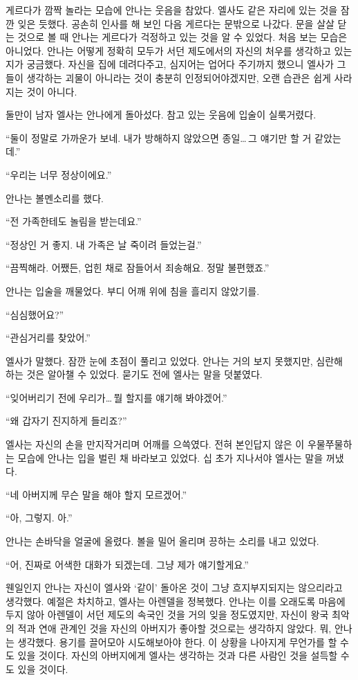 게르다가 깜짝 놀라는 모습에 안나는 웃음을 참았다. 엘사도 같은 자리에 있는 것을 잠깐 잊은 듯했다. 공손히 인사를 해 보인 다음 게르다는 문밖으로 나갔다. 문을 살살 닫는 것으로 볼 때 안나는 게르다가 걱정하고 있는 것을 알 수 있었다. 처음 보는 모습은 아니었다. 안나는 어떻게 정확히 모두가 서던 제도에서의 자신의 처우를 생각하고 있는지가 궁금했다. 자신을 집에 데려다주고, 심지어는 업어다 주기까지 했으니 엘사가 그들이 생각하는 괴물이 아니라는 것이 충분히 인정되어야겠지만, 오랜 습관은 쉽게 사라지는 것이 아니다.

둘만이 남자 엘사는 안나에게 돌아섰다. 참고 있는 웃음에 입술이 실룩거렸다.

``둘이 정말로 가까운가 보네. 내가 방해하지 않았으면 종일\ldots\,그 얘기만 할 거 같았는데.''

``우리는 너무 정상이에요.''

안나는 볼멘소리를 했다.

``전 가족한테도 놀림을 받는데요.''

``정상인 거 좋지. 내 가족은 날 죽이려 들었는걸.''

``끔찍해라. 어쨌든, 업힌 채로 잠들어서 죄송해요. 정말 불편했죠.''

안나는 입술을 깨물었다. 부디 어깨 위에 침을 흘리지 않았기를.

``심심했어요?''

``관심거리를 찾았어.''

엘사가 말했다. 잠깐 눈에 초점이 풀리고 있었다. 안나는 거의 보지 못했지만, 심란해 하는 것은 알아챌 수 있었다. 묻기도 전에 엘사는 말을 덧붙였다.

``잊어버리기 전에 우리가\ldots\,뭘 할지를 얘기해 봐야겠어.''

``왜 갑자기 진지하게 들리죠?''

엘사는 자신의 손을 만지작거리며 어깨를 으쓱였다. 전혀 본인답지 않은 이 우물쭈물하는 모습에 안나는 입을 벌린 채 바라보고 있었다. 십 초가 지나서야 엘사는 말을 꺼냈다.

``네 아버지께 무슨 말을 해야 할지 모르겠어.''

``아, 그렇지. 아.''

안나는 손바닥을 얼굴에 올렸다. 볼을 밀어 올리며 끙하는 소리를 내고 있었다.

``어, 진짜로 어색한 대화가 되겠는데. 그냥 제가 얘기할게요.''

웬일인지 안나는 자신이 엘사와 `같이' 돌아온 것이 그냥 흐지부지되지는 않으리라고 생각했다. 예절은 차치하고, 엘사는 아렌델을 정복했다. 안나는 이를 오래도록 마음에 두지 않아 아렌델이 서던 제도의 속국인 것을 거의 잊을 정도였지만, 자신이 왕국 최악의 적과 연애 관계인 것을 자신의 아버지가 좋아할 것으로는 생각하지 않았다. 뭐, 안나는 생각했다. 용기를 끌어모아 시도해보아야 한다. 이 상황을 나아지게 무언가를 할 수도 있을 것이다. 자신의 아버지에게 엘사는 생각하는 것과 다른 사람인 것을 설득할 수도 있을 것이다.

